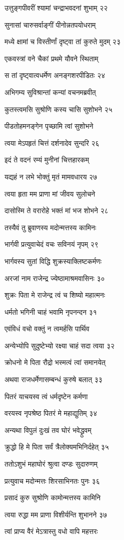 उत्तुङ्गपीवरीं श्यामां चन्द्राभवदनां शुभाम् २२

सुनासां चारुसर्वाङ्गीं पीनोन्नतपयोधराम्

मध्ये क्षामां च विस्तीर्णां दृष्ट्वा तां कुरुते मुदम् २३

एकवस्त्रां वने चैकां प्रथमे यौवने स्थिताम्

स तां दृष्ट्वात्वधर्मेण अनङ्गशरपीडितः २४

अभिगम्य सुविश्रान्तां कन्यां वचनमब्रवीत्

कुतस्त्वमसि सुश्रोणि कस्य चासि सुशोभने २५

पीडतोहमनङ्गेन पृच्छामि त्वां सुशोभने

त्वया मेऽपहृतं चित्तं दर्शनादेव सुन्दरि २६

इदं ते वदनं रम्यं मुनीनां चित्तहारकम्

यद्यहं न लभे भोक्तुं मृतं मामवधारय २७

त्वया हृता मम प्राणा मां जीवय सुलोचने

दासोस्मि ते वरारोहे भक्तं मां भज शोभने २८

तस्यैवं तु ब्रुवाणस्य मदोन्मत्तस्य कामिनः

भार्गवी प्रत्युवाचेदं वचः सविनयं नृपम् २९

भार्गवस्य सुतां विद्धि शुक्रस्याक्लिष्टकर्मणः

अरजां नाम राजेन्द्र ज्येष्ठामाश्रमवासिनः ३०

शुक्रः पिता मे राजेन्द्र त्वं च शिष्यो महात्मनः

धर्मतो भगिनी चाहं भवामि नृपनन्दन ३१

एवंविधं वचो वक्तुं न त्वमर्हसि पार्थिव

अन्येभ्योपि सुदुष्टेभ्यो रक्ष्या चाहं सदा त्वया ३२

क्रोधनो मे पिता रौद्रो भस्मत्वं त्वां समानयेत्

अथवा राजधर्मेणासम्बन्धं कुरुषे बलात् ३३

पितरं याचयस्व त्वं धर्मदृष्टेन कर्मणा

वरयस्व नृपश्रेष्ठ पितरं मे महाद्युतिम् ३४

अन्यथा विपुलं दुःखं तव घोरं भवेद्ध्रुवम्

क्रुद्धो हि मे पिता सर्वं त्रैलोक्यमभिनिर्दहेत् ३५

ततोऽशुभं महाघोरं श्रुत्वा दण्डः सुदारुणम्

प्रत्युवाच मदोन्मत्तः शिरसाभिनतः पुनः ३६

प्रसादं कुरु सुश्रोणि कामोन्मत्तस्य कामिनि

त्वया रुद्धा मम प्राणा विशीर्यन्ति शुभानने ३७

त्वां प्राप्य वैरं मेऽत्रास्तु वधो वापि महत्तरः

